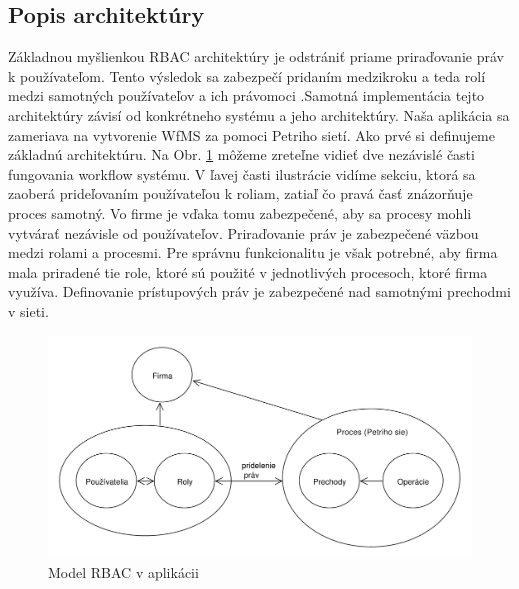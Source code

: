 \subsection{Popis architektúry}
Základnou myšlienkou RBAC architektúry je odstrániť priame priraďovanie práv k používateľom. Tento výsledok sa zabezpečí pridaním medzikroku a teda rolí medzi samotných používateľov a ich právomoci .Samotná implementácia tejto architektúry závisí od konkrétneho systému a jeho architektúry. Naša aplikácia sa zameriava na vytvorenie WfMS za pomoci Petriho sietí. Ako prvé si definujeme základnú architektúru. Na Obr. \ref{fig:model_rbac_v_aplikacii} môžeme zreteľne vidieť dve nezávislé časti fungovania workflow systému. V ľavej časti ilustrácie vidíme sekciu, ktorá sa zaoberá  prideľovaním  používateľou k roliam, zatiaľ čo pravá časť znázorňuje proces samotný. Vo firme je vďaka tomu zabezpečené, aby sa procesy mohli vytvárať nezávisle od používateľov. Priraďovanie práv je zabezpečené väzbou medzi rolami a procesmi. Pre správnu funkcionalitu je však potrebné, aby firma mala priradené tie role, ktoré sú použité v jednotlivých procesoch, ktoré firma využíva. Definovanie prístupových práv je zabezpečené nad samotnými prechodmi v sieti.

\begin{figure}[h]
	\centering
	\includegraphics[width=0.9\linewidth]{images/roles_in_petri_model}
	\caption{ Model RBAC v aplikácii}
	\label{fig:model_rbac_v_aplikacii}
\end{figure}

